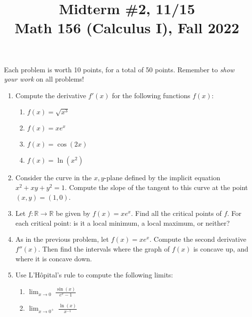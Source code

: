 \documentclass[11pt]{article}
\title{Midterm \#2, 11/15 \\ Math 156 (Calculus I), Fall 2022}
\date{}
\begin{document}
\maketitle

\thispagestyle{empty}

\vspace{-1cm}

Each problem is worth 10 points, for a total of 50 points. Remember to \emph{show your work} on all problems!

\begin{enumerate}
\item Compute the derivative $f'(x)$ for the following functions $f(x)$:
\begin{enumerate}
\item $f(x) = \sqrt{x^3}$
\item $f(x) = x e^{x}$
\item $f(x) = \cos(2x)$
\item $f(x) = \ln(x^2)$
\end{enumerate}

\item Consider the curve in the $x,y$-plane defined by the implicit equation $x^2 + xy + y^2 = 1$. Compute the slope of the tangent to this curve at the point $(x,y) = (1,0)$.

\item Let $f\colon \mathbb{R}\to \mathbb{R}$ be given by $f(x) = x e^{x}$. Find all the critical points of $f$. For each critical point: is it a local minimum, a local maximum, or neither?

\item As in the previous problem, let $f(x) = x e^{x}$. Compute the second derivative $f''(x)$. Then find the intervals where the graph of $f(x)$ is concave up, and where it is concave down.

\item Use L'H\^{o}pital's rule to compute the following limits:
\begin{enumerate}
\item $\displaystyle \lim_{x \to 0} \; \frac{\sin(x)}{e^x - 1}$ \\[0.25em]
\item $\displaystyle \lim_{x \to 0^+} \; \frac{\ln(x)}{x^{-1}}$
\end{enumerate}
\end{enumerate}
\end{document}
